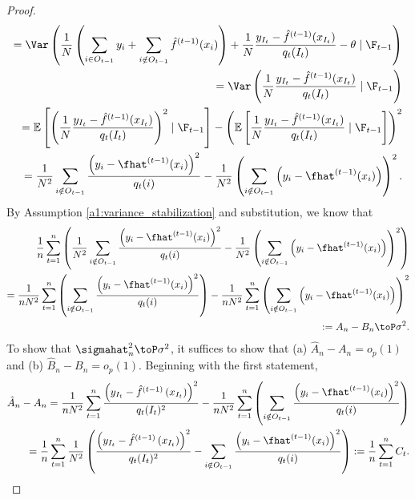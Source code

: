\documentclass[11pt]{article}
\begin{document}
\begin{proof}
\begin{align*}
        = \Var\left( \frac{1}{N}\left( \sum_{i \in O_{t-1}} y_i + \sum_{i \notin O_{t-1}} \hat{f}^{(t-1)}(x_{i}) \right) + \frac{1}{N}\frac{y_{I_t} - \hat{f}^{(t-1)}(x_{I_t})}{q_t(I_t)} - \theta \mid \F_{t-1} \right)\\
        = \Var\left( \frac{1}{N}\frac{y_{I_t} - \hat{f}^{(t-1)}(x_{I_t})}{q_t(I_t)} \mid \F_{t-1} \right)\\ = \mathbb{E}\left[ \left( \frac{1}{N}\frac{y_{I_t} - \hat{f}^{(t-1)}(x_{I_t})}{q_t(I_t)} \right)^2 \mid \F_{t-1} \right] - \left(  \mathbb{E}\left[ \frac{1}{N}\frac{y_{I_t} - \hat{f}^{(t-1)}(x_{I_t})}{q_t(I_t)} \mid \F_{t-1} \right] \right)^2\\
        = \frac{1}{N^2} \sum_{i \notin O_{t-1}} \frac{\left( y_i - \fhat^{(t-1)}(x_i) \right)^2}{q_t(i)} -  \frac{1}{N^2} \left( \sum_{i \notin O_{t-1}} \left( y_i - \fhat^{(t-1)}(x_i) \right) \right)^2.
    \end{align*}
    By Assumption \ref{a1:variance_stabilization} and substitution, we know that
    \begin{align*}
        \frac{1}{n} \sum_{t=1}^n \left( \frac{1}{N^2} \sum_{i \notin O_{t-1}} \frac{\left( y_i - \fhat^{(t-1)}(x_i) \right)^2}{q_t(i)} -  \frac{1}{N^2} \left( \sum_{i \notin O_{t-1}} \left( y_i - \fhat^{(t-1)}(x_i) \right) \right)^2 \right) \\
        = \frac{1}{n N^2} \sum_{t=1}^n \left( \sum_{i \notin O_{t-1}} \frac{\left( y_i - \fhat^{(t-1)}(x_i) \right)^2}{q_t(i)} \right) - \frac{1}{n N^2} \sum_{t=1}^n \left( \sum_{i \notin O_{t-1}} \left( y_i - \fhat^{(t-1)}(x_i) \right) \right)^2\\
        := A_n - B_n \toP \sigma^2.
    \end{align*}
    To show that $\sigmahat_n^2 \toP \sigma^2$, it suffices to show that (a) $\hat{A}_n - A_n = o_p(1)$ and (b) $\hat{B}_n - B_n = o_p(1)$. Beginning with the first statement,
    \begin{align*}
        \hat{A}_n - A_n = \frac{1}{nN^2} \sum_{t=1}^n \frac{\left( y_{I_t} - \hat{f}^{(t-1)}\left( x_{I_t} \right) \right)^2}{q_t(I_t)^2} - \frac{1}{n N^2} \sum_{t=1}^n \left( \sum_{i \notin O_{t-1}} \frac{\left( y_i - \fhat^{(t-1)}(x_i) \right)^2}{q_t(i)} \right)\\
        = \frac{1}{n} \sum_{t=1}^n \frac{1}{N^2}\left( \frac{\left( y_{I_t} - \hat{f}^{(t-1)}\left( x_{I_t} \right) \right)^2}{q_t(I_t)^2} - \sum_{i \notin O_{t-1}} \frac{\left( y_i - \fhat^{(t-1)}(x_i) \right)^2}{q_t(i)} \right) := \frac{1}{n} \sum_{t=1}^n C_t. 

\end{align*}
\end{proof}
\end{document}
